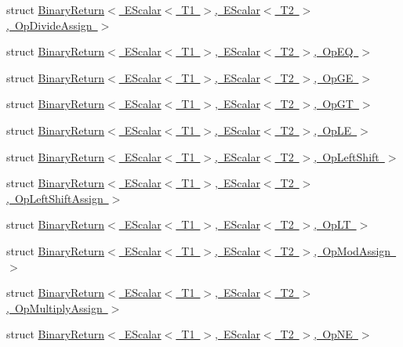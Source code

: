 \begin{DoxyCompactItemize}
\item 
struct \mbox{\hyperlink{structENSEM_1_1BinaryReturn_3_01EScalar_3_01T1_01_4_00_01EScalar_3_01T2_01_4_00_01OpDivideAssign_01_4}{Binary\+Return$<$ E\+Scalar$<$ T1 $>$, E\+Scalar$<$ T2 $>$, Op\+Divide\+Assign $>$}}
\item 
struct \mbox{\hyperlink{structENSEM_1_1BinaryReturn_3_01EScalar_3_01T1_01_4_00_01EScalar_3_01T2_01_4_00_01OpEQ_01_4}{Binary\+Return$<$ E\+Scalar$<$ T1 $>$, E\+Scalar$<$ T2 $>$, Op\+E\+Q $>$}}
\item 
struct \mbox{\hyperlink{structENSEM_1_1BinaryReturn_3_01EScalar_3_01T1_01_4_00_01EScalar_3_01T2_01_4_00_01OpGE_01_4}{Binary\+Return$<$ E\+Scalar$<$ T1 $>$, E\+Scalar$<$ T2 $>$, Op\+G\+E $>$}}
\item 
struct \mbox{\hyperlink{structENSEM_1_1BinaryReturn_3_01EScalar_3_01T1_01_4_00_01EScalar_3_01T2_01_4_00_01OpGT_01_4}{Binary\+Return$<$ E\+Scalar$<$ T1 $>$, E\+Scalar$<$ T2 $>$, Op\+G\+T $>$}}
\item 
struct \mbox{\hyperlink{structENSEM_1_1BinaryReturn_3_01EScalar_3_01T1_01_4_00_01EScalar_3_01T2_01_4_00_01OpLE_01_4}{Binary\+Return$<$ E\+Scalar$<$ T1 $>$, E\+Scalar$<$ T2 $>$, Op\+L\+E $>$}}
\item 
struct \mbox{\hyperlink{structENSEM_1_1BinaryReturn_3_01EScalar_3_01T1_01_4_00_01EScalar_3_01T2_01_4_00_01OpLeftShift_01_4}{Binary\+Return$<$ E\+Scalar$<$ T1 $>$, E\+Scalar$<$ T2 $>$, Op\+Left\+Shift $>$}}
\item 
struct \mbox{\hyperlink{structENSEM_1_1BinaryReturn_3_01EScalar_3_01T1_01_4_00_01EScalar_3_01T2_01_4_00_01OpLeftShiftAssign_01_4}{Binary\+Return$<$ E\+Scalar$<$ T1 $>$, E\+Scalar$<$ T2 $>$, Op\+Left\+Shift\+Assign $>$}}
\item 
struct \mbox{\hyperlink{structENSEM_1_1BinaryReturn_3_01EScalar_3_01T1_01_4_00_01EScalar_3_01T2_01_4_00_01OpLT_01_4}{Binary\+Return$<$ E\+Scalar$<$ T1 $>$, E\+Scalar$<$ T2 $>$, Op\+L\+T $>$}}
\item 
struct \mbox{\hyperlink{structENSEM_1_1BinaryReturn_3_01EScalar_3_01T1_01_4_00_01EScalar_3_01T2_01_4_00_01OpModAssign_01_4}{Binary\+Return$<$ E\+Scalar$<$ T1 $>$, E\+Scalar$<$ T2 $>$, Op\+Mod\+Assign $>$}}
\item 
struct \mbox{\hyperlink{structENSEM_1_1BinaryReturn_3_01EScalar_3_01T1_01_4_00_01EScalar_3_01T2_01_4_00_01OpMultiplyAssign_01_4}{Binary\+Return$<$ E\+Scalar$<$ T1 $>$, E\+Scalar$<$ T2 $>$, Op\+Multiply\+Assign $>$}}
\item 
struct \mbox{\hyperlink{structENSEM_1_1BinaryReturn_3_01EScalar_3_01T1_01_4_00_01EScalar_3_01T2_01_4_00_01OpNE_01_4}{Binary\+Return$<$ E\+Scalar$<$ T1 $>$, E\+Scalar$<$ T2 $>$, Op\+N\+E $>$}}

\end{DoxyCompactItemize}

